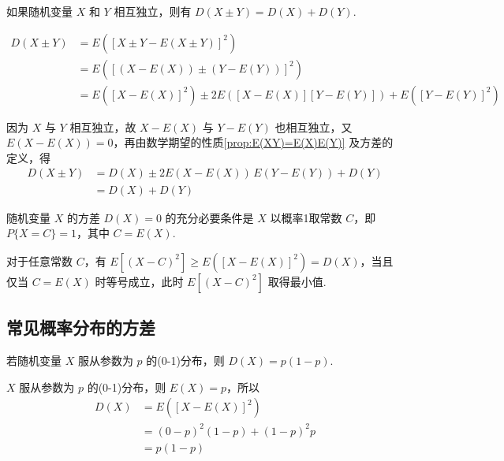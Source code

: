 \begin{property} \label{prop:D(X+Y)=D(X)+D(Y)}
    如果随机变量 $X$ 和 $Y$ 相互独立，则有 $D(X \pm Y) = D(X)+D(Y)$.
\end{property}

\begin{myproof}
    $$
    \begin{aligned}
        D(X \pm Y) &= E([X \pm Y - E(X \pm Y)]^2) \\
        &= E([(X-E(X)) \pm (Y-E(Y))]^2) \\
        &= E([X-E(X)]^2) \pm 2E([X-E(X)][Y-E(Y)]) + E([Y-E(Y)]^2)
    \end{aligned}
    $$

    因为 $X$ 与 $Y$ 相互独立，故 $X-E(X)$ 与 $Y-E(Y)$ 也相互独立，又 $E(X-E(X)) = 0$，再由数学期望的性质\ref*{prop:E(XY)=E(X)E(Y)} 及方差的定义，得
    $$
    \begin{aligned}
        D(X \pm Y) &= D(X) \pm 2E(X-E(X)) \, E(Y-E(Y)) + D(Y) \\
        &= D(X) + D(Y)
    \end{aligned}
    $$
\end{myproof}

\begin{property} \label{prop:D(X)=0}
    随机变量 $X$ 的方差 $D(X)=0$ 的充分必要条件是 $X$ 以概率1取常数 $C$，即 $P\{X=C\}=1$，其中 $C=E(X)$.
\end{property}

\begin{conclusion}
    对于任意常数 $C$，有 $E[(X-C)^2] \geqslant E([X-E(X)]^2) = D(X)$，当且仅当 $C=E(X)$ 时等号成立，此时 $E[(X-C)^2]$ 取得最小值.
\end{conclusion}

\subsection{常见概率分布的方差}

\begin{conclusion}
    若随机变量 $X$ 服从参数为 $p$ 的(0-1)分布，则 $D(X) = p(1-p)$.
\end{conclusion}

\begin{myproof}
    $X$ 服从参数为 $p$ 的(0-1)分布，则 $E(X)=p$，所以
    $$
    \begin{aligned}
        D(X) &= E([X-E(X)]^2) \\
        &= (0-p)^2 (1-p) + (1-p)^2 p \\
        &= p(1-p)
    \end{aligned}
    $$

    \vspace{-1.3em}
\end{myproof}

